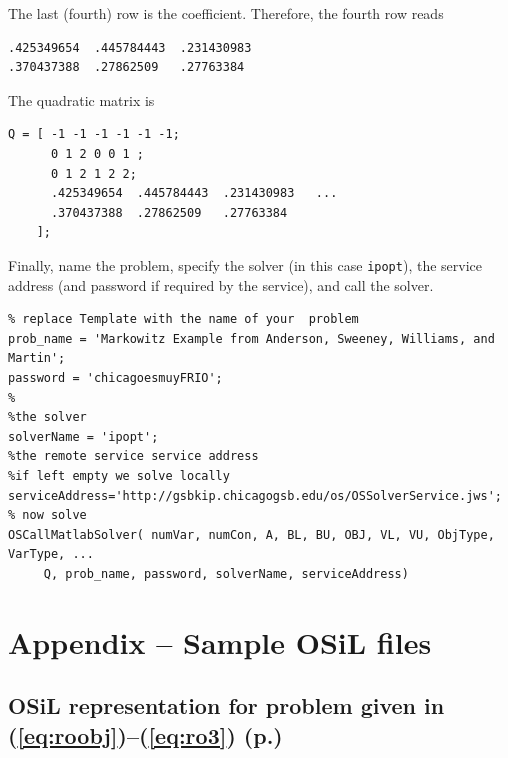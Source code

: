 \documentclass[11pt]{article}
\renewcommand{\_}{{\char"5F}}
\renewcommand{\{}{{\char"7B}}
\renewcommand{\}}{{\char"7D}}
\renewcommand{\^}{{\char"0D}}
\renewcommand{\'}{{\char"0D}}
\begin{document}
\begin{enumerate}[Step 1:]
The last (fourth) row is the coefficient. Therefore, the fourth row reads





\begin{verbatim}
.425349654  .445784443  .231430983
.370437388  .27862509   .27763384
\end{verbatim}


The quadratic matrix is



\begin{verbatim}
Q = [ -1 -1 -1 -1 -1 -1;
      0 1 2 0 0 1 ;
      0 1 2 1 2 2;
      .425349654  .445784443  .231430983   ...
      .370437388  .27862509   .27763384
    ];
\end{verbatim}


Finally, name the problem, specify the solver (in this case {\tt ipopt}), the service address (and password if required by the service), and call the solver.



\begin{verbatim}
% replace Template with the name of your  problem
prob_name = 'Markowitz Example from Anderson, Sweeney, Williams, and Martin';
password = 'chicagoesmuyFRIO';
%
%the solver
solverName = 'ipopt';
%the remote service service address
%if left empty we solve locally
serviceAddress='http://gsbkip.chicagogsb.edu/os/OSSolverService.jws';
% now solve
OSCallMatlabSolver( numVar, numCon, A, BL, BU, OBJ, VL, VU, ObjType, VarType, ...
     Q, prob_name, password, solverName, serviceAddress)
\end{verbatim}


\section{Appendix -- Sample OSiL files}\label{section:appendix}

\subsection{OSiL representation for problem given in (\ref{eq:roobj})--(\ref{eq:ro3}) (p.\pageref{eq:roobj})}\label{section:rosenbrockXML}



\end{enumerate}
\end{document}
